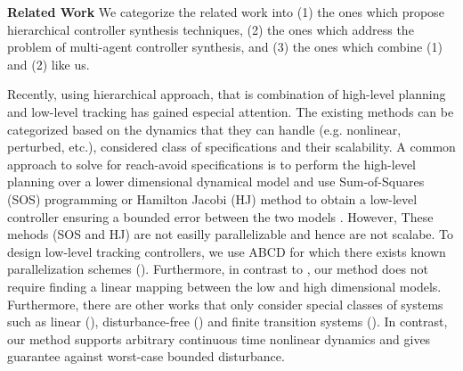 \smallskip
\noindent\textbf{Related Work}
%
We categorize the related work into (1) the ones which propose hierarchical controller synthesis techniques, (2) the ones which address the problem of multi-agent controller synthesis, and (3) the ones which combine (1) and (2) like us.

Recently, using hierarchical approach, that is combination of high-level planning and low-level tracking has gained especial attention. The existing methods can be categorized based on the dynamics that they can handle (e.g. nonlinear, perturbed, etc.), considered class of specifications and their scalability. A common approach to solve for reach-avoid specifications is to perform the high-level planning over a lower dimensional dynamical model and use
Sum-of-Squares (SOS) programming or Hamilton Jacobi (HJ) method to obtain a low-level controller ensuring a bounded error between the two models \cite{herbert2017fastrack,DBLP:journals/corr/abs-1911-09773,singh2018robust}. However, These mehods (SOS and HJ) are not easilly parallelizable and hence are not scalabe. To design low-level tracking controllers, we use ABCD for which there exists known parallelization schemes (\cite{KhaledZ19pfaces}). Furthermore, in contrast to \cite{herbert2017fastrack,singh2018robust}, our method does not require finding a linear mapping between the low and high dimensional models. Furthermore, there are other works that only consider special classes of systems such as linear (\cite{fan2018controller,wongpiromsarn2012receding}), disturbance-free (\cite{tedrake2010lqr,fan2020fast}) and finite transition systems (\cite{Yang2017milp}). In contrast, our method supports arbitrary continuous time nonlinear dynamics and gives guarantee against worst-case bounded disturbance.
	

